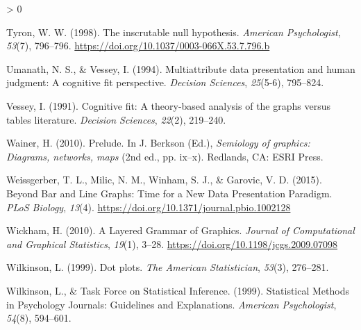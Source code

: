 \documentclass[
  english,
  man]{apa6}
\newlength{\cslhangindent}
\newenvironment{CSLReferences}[2] %
 {%
  \setlength{\parindent}{0pt}
  \ifodd #1 \everypar{\setlength{\hangindent}{\cslhangindent}}\ignorespaces\fi
  \ifnum #2 > 0
  \setlength{\parskip}{#2\baselineskip}
  \fi
 }%
 {}
\begin{document}
\begin{CSLReferences}{1}{0}
\leavevmode\hypertarget{ref-Tyron1998}{}%
Tyron, W. W. (1998). {The inscrutable null hypothesis.} \emph{American Psychologist}, \emph{53}(7), 796--796. \url{https://doi.org/10.1037/0003-066X.53.7.796.b}

\leavevmode\hypertarget{ref-umanath1994multiattribute}{}%
Umanath, N. S., \& Vessey, I. (1994). Multiattribute data presentation and human judgment: A cognitive fit perspective. \emph{Decision Sciences}, \emph{25}(5-6), 795--824.

\leavevmode\hypertarget{ref-vessey1991cognitive}{}%
Vessey, I. (1991). Cognitive fit: A theory-based analysis of the graphs versus tables literature. \emph{Decision Sciences}, \emph{22}(2), 219--240.

\leavevmode\hypertarget{ref-Wainer2010}{}%
Wainer, H. (2010). {Prelude}. In J. Berkson (Ed.), \emph{Semiology of graphics: Diagrams, networks, maps} (2nd ed., pp. ix--x). Redlands, CA: ESRI Press.

\leavevmode\hypertarget{ref-Weissgerber2015}{}%
Weissgerber, T. L., Milic, N. M., Winham, S. J., \& Garovic, V. D. (2015). {Beyond Bar and Line Graphs: Time for a New Data Presentation Paradigm}. \emph{PLoS Biology}, \emph{13}(4). \url{https://doi.org/10.1371/journal.pbio.1002128}

\leavevmode\hypertarget{ref-Wickham2010}{}%
Wickham, H. (2010). {A Layered Grammar of Graphics}. \emph{Journal of Computational and Graphical Statistics}, \emph{19}(1), 3--28. \url{https://doi.org/10.1198/jcgs.2009.07098}

\leavevmode\hypertarget{ref-Wilkinson1999}{}%
Wilkinson, L. (1999). {Dot plots}. \emph{The American Statistician}, \emph{53}(3), 276--281.

\leavevmode\hypertarget{ref-Wilkinson1999a}{}%
Wilkinson, L., \& Task Force on Statistical Inference. (1999). {Statistical Methods in Psychology Journals: Guidelines and Explanations}. \emph{American Psychologist}, \emph{54}(8), 594--601.

\end{CSLReferences}

\endgroup
\end{document}
